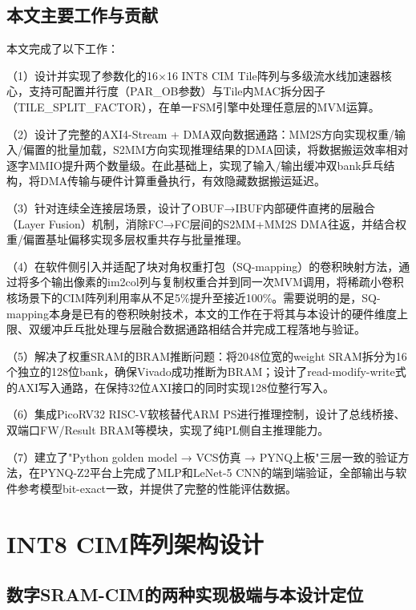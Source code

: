 \documentclass[12pt, a4paper]{article}
\begin{document}
\subsection{本文主要工作与贡献}

本文完成了以下工作：

（1）设计并实现了参数化的16×16 INT8 CIM Tile阵列与多级流水线加速器核心，支持可配置并行度（PAR\_OB参数）与Tile内MAC拆分因子（TILE\_SPLIT\_FACTOR），在单一FSM引擎中处理任意层的MVM运算。

（2）设计了完整的AXI4-Stream + DMA双向数据通路：MM2S方向实现权重/输入/偏置的批量加载，S2MM方向实现推理结果的DMA回读，将数据搬运效率相对逐字MMIO提升两个数量级。在此基础上，实现了输入/输出缓冲双bank乒乓结构，将DMA传输与硬件计算重叠执行，有效隐藏数据搬运延迟。

（3）针对连续全连接层场景，设计了OBUF→IBUF内部硬件直拷的层融合（Layer Fusion）机制，消除FC→FC层间的S2MM+MM2S DMA往返，并结合权重/偏置基址偏移实现多层权重共存与批量推理。

（4）在软件侧引入并适配了块对角权重打包（SQ-mapping）的卷积映射方法，通过将多个输出像素的im2col列与复制权重合并到同一次MVM调用，将稀疏小卷积核场景下的CIM阵列利用率从不足5\%提升至接近100\%。需要说明的是，SQ-mapping本身是已有的卷积映射技术，本文的工作在于将其与本设计的硬件维度上限、双缓冲乒乓批处理与层融合数据通路相结合并完成工程落地与验证。

（5）解决了权重SRAM的BRAM推断问题：将2048位宽的weight SRAM拆分为16个独立的128位bank，确保Vivado成功推断为BRAM；设计了read-modify-write式的AXI写入通路，在保持32位AXI接口的同时实现128位整行写入。

（6）集成PicoRV32 RISC-V软核替代ARM PS进行推理控制，设计了总线桥接、双端口FW/Result BRAM等模块，实现了纯PL侧自主推理能力。

（7）建立了"Python golden model → VCS仿真 → PYNQ上板"三层一致的验证方法，在PYNQ-Z2平台上完成了MLP和LeNet-5 CNN的端到端验证，全部输出与软件参考模型bit-exact一致，并提供了完整的性能评估数据。

\section{INT8 CIM阵列架构设计}

\subsection{数字SRAM-CIM的两种实现极端与本设计定位}
\label{sec:two_extremes}
\end{document}
